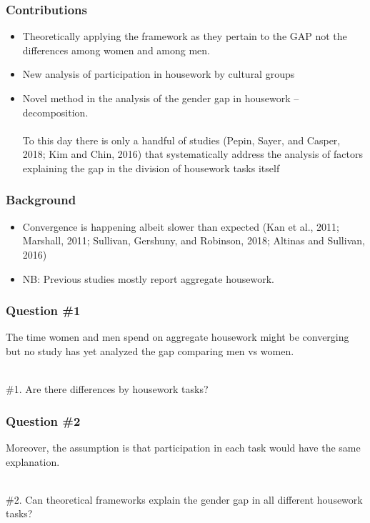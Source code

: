 \documentclass{beamer}
\begin{document}
\begin{frame}
\frametitle{Contributions}
  	\begin{itemize}
  	\item Theoretically applying the framework as they pertain to the GAP not the differences among women and among men.
  	\item New analysis of participation in housework by cultural groups
  	\item Novel method in the analysis of the gender gap in housework – decomposition. \\~\\
  	
  	\hspace*{20pt} To this day there is only a handful of studies (Pepin, Sayer, and Casper, 2018; Kim and Chin, 2016) that systematically address the analysis of factors explaining the gap in the division of housework tasks itself

  	\end{itemize}
\end{frame}

\begin{frame}
\frametitle{Background}
  	\begin{itemize}
  	\item Convergence is happening albeit slower than expected (Kan et al., 2011; Marshall, 2011; Sullivan, Gershuny, and Robinson, 2018; Altinas and Sullivan, 2016)
  	\item NB: Previous studies mostly report aggregate housework. 

  	\end{itemize}
\end{frame}

\begin{frame}
\frametitle{Question \#1}

The time women and men spend on aggregate housework might be converging but no study has yet analyzed the gap comparing men vs women. \\~\\

\begin{tcolorbox}[colback=green!5,colframe=green!40!black,title=Question 1] 
\#1. Are there differences by housework tasks?
\end{tcolorbox}

\end{frame}

\begin{frame}
\frametitle{Question \#2}

Moreover, the assumption is that participation in each task would have the same explanation.
 \\~\\

\begin{tcolorbox}[colback=green!5,colframe=green!40!black,title=Question 2] 
\#2. Can theoretical frameworks explain the gender gap in all different housework tasks?  

\end{tcolorbox}

\end{frame}
\end{document}
